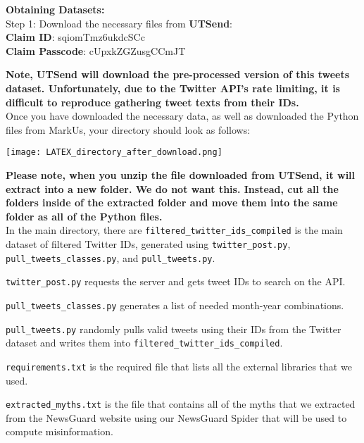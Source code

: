 \documentclass[fontsize=11pt]{article}
\begin{document}
    \begin{flushleft}

        \textbf{Obtaining Datasets:}\\

        Step 1: Download the necessary files from \textbf{UTSend}:\\
        \textbf{Claim ID}: sqiomTmz6ukdcSCc \\
        \textbf{Claim Passcode}: cUpxkZGZusgCCmJT
        \hfill\break

        \textbf{Note, UTSend will download the pre-processed version of this tweets dataset. Unfortunately, due to the Twitter API's rate limiting, it is difficult to reproduce gathering tweet texts from their IDs.}\\

        Once you have downloaded the necessary data, as well as downloaded the Python files from MarkUs, your directory should look as follows:

        \texttt{[image: LATEX\_directory\_after\_download.png]}

        \textbf{Please note, when you unzip the file downloaded from UTSend, it will extract into a new folder. We do not want this. Instead, cut all the folders inside of the extracted folder and move them into the same folder as all of the Python files.}
        \\

        In the main directory, there are
        \texttt{filtered\_twitter\_ids\_compiled} is the main dataset of filtered Twitter IDs, generated using \texttt{twitter\_post.py}, \texttt{pull\_tweets\_classes.py}, and \texttt{pull\_tweets.py}.

        \texttt{twitter\_post.py} requests the server and gets tweet IDs to search on the API.

        \texttt{pull\_tweets\_classes.py} generates a list of needed month-year combinations.

        \texttt{pull\_tweets.py} randomly pulls valid tweets using their IDs from the Twitter dataset and writes them into \texttt{filtered\_twitter\_ids\_compiled}.
        \hfill\break

        \texttt{requirements.txt} is the required file that lists all the external libraries that we used.

        \texttt{extracted\_myths.txt} is the file that contains all of the myths that we extracted from the NewsGuard website using our NewsGuard Spider that will be used to compute misinformation.


\end{flushleft}
\end{document}
